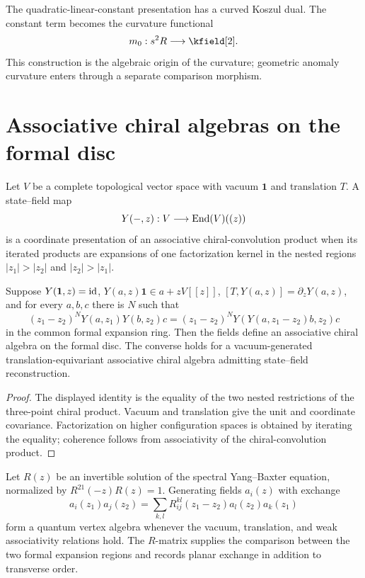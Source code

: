 The quadratic-linear-constant presentation has a curved Koszul dual. The constant term becomes the curvature functional
\[
 m_0:s^2R\longrightarrow\kfield[2].
\]
This construction is the algebraic origin of the curvature; geometric anomaly curvature enters through a separate comparison morphism.


\chapter{Associative chiral algebras on the formal disc}
Let $V$ be a complete topological vector space with vacuum $\mathbf1$ and translation $T$.  A state--field map
\[
 Y(-,z):V\longrightarrow\operatorname{End}(V)((z))
\]
is a coordinate presentation of an associative chiral-convolution product when its iterated products are expansions of one factorization kernel in the nested regions $|z_1|>|z_2|$ and $|z_2|>|z_1|$.

\begin{proposition}
Suppose $Y(\mathbf1,z)=\operatorname{id}$, $Y(a,z)\mathbf1\in a+zV[[z]]$, $[T,Y(a,z)]=\partial_zY(a,z)$, and for every $a,b,c$ there is $N$ such that
\[
 (z_1-z_2)^N Y(a,z_1)Y(b,z_2)c
 =(z_1-z_2)^N Y(Y(a,z_1-z_2)b,z_2)c
\]
in the common formal expansion ring.  Then the fields define an associative chiral algebra on the formal disc.  The converse holds for a vacuum-generated translation-equivariant associative chiral algebra admitting state--field reconstruction.
\end{proposition}
\begin{proof}
The displayed identity is the equality of the two nested restrictions of the three-point chiral product.  Vacuum and translation give the unit and coordinate covariance.  Factorization on higher configuration spaces is obtained by iterating the equality; coherence follows from associativity of the chiral-convolution product.
\end{proof}

\begin{example}
Let $R(z)$ be an invertible solution of the spectral Yang--Baxter equation, normalized by $R^{21}(-z)R(z)=1$.  Generating fields $a_i(z)$ with exchange
\[
 a_i(z_1)a_j(z_2)
 =\sum_{k,l}R_{ij}^{kl}(z_1-z_2)a_l(z_2)a_k(z_1)
\]
form a quantum vertex algebra whenever the vacuum, translation, and weak associativity relations hold.  The $R$-matrix supplies the comparison between the two formal expansion regions and records planar exchange in addition to transverse order.
\end{example}

